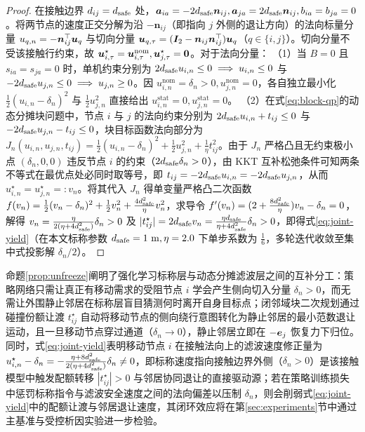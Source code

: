 \begin{proof}
在接触边界 $d_{ij}=d_{\mathrm{safe}}$ 处，$\boldsymbol a_{ia}=-2d_{\mathrm{safe}}\boldsymbol n_{ij},\boldsymbol a_{ja}=2d_{\mathrm{safe}}\boldsymbol n_{ij},b_{ia}=b_{ja}=0$。将两节点的速度正交分解为沿 $-\boldsymbol n_{ij}$（即指向 $j$ 外侧的退让方向）的法向标量分量 $u_{q,n}=-\boldsymbol n_{ij}^{\top}\boldsymbol{u}_q$ 与切向分量 $\boldsymbol{u}_{q,\tau}=(\boldsymbol{I}_2-\boldsymbol n_{ij}\boldsymbol n_{ij}^{\top})\boldsymbol{u}_q$（$q\in\{i,j\}$）。切向分量不受该接触行约束，故 $\boldsymbol{u}_{i,\tau}^\star=\boldsymbol{u}_{i,\tau}^{\mathrm{nom}},\boldsymbol{u}_{j,\tau}^\star=\boldsymbol 0$。对于法向分量：
（1）当 $B=0$ 且 $s_{ia}=s_{ja}=0$ 时，单机约束分别为 $2d_{\mathrm{safe}} u_{i,n}\le 0\implies u_{i,n}\le 0$ 与 $-2d_{\mathrm{safe}} u_{j,n}\le 0\implies u_{j,n}\ge 0$。因 $u_{i,n}^{\mathrm{nom}}=\delta_n>0,u_{j,n}^{\mathrm{nom}}=0$，各自独立最小化 $\frac12(u_{i,n}-\delta_n)^2$ 与 $\frac12 u_{j,n}^2$ 直接给出 $u_{i,n}^{\mathrm{stat}}=0,u_{j,n}^{\mathrm{stat}}=0$。
（2）在式\eqref{eq:block-qp}的动态分摊块问题中，节点 $i$ 与 $j$ 的法向约束分别为 $2d_{\mathrm{safe}} u_{i,n}+t_{ij}\le 0$ 与 $-2d_{\mathrm{safe}} u_{j,n}-t_{ij}\le 0$，块目标函数法向部分为 $J_n(u_{i,n},u_{j,n},t_{ij})=\frac12(u_{i,n}-\delta_n)^2+\frac12 u_{j,n}^2+\frac{1}{\eta}t_{ij}^2$。由于 $J_n$ 严格凸且无约束极小点 $(\delta_n,0,0)$ 违反节点 $i$ 的约束（$2d_{\mathrm{safe}}\delta_n>0$），由 KKT 互补松弛条件可知两条不等式在最优点处必同时取等号，即 $t_{ij}=-2d_{\mathrm{safe}} u_{i,n}=-2d_{\mathrm{safe}} u_{j,n}$，从而 $u_{i,n}^\star=u_{j,n}^\star=:v_n$。将其代入 $J_n$ 得单变量严格凸二次函数 $f(v_n)=\frac12(v_n-\delta_n)^2+\frac12 v_n^2+\frac{4d_{\mathrm{safe}}^2}{\eta}v_n^2$，求导令 $f'(v_n)=(2+\frac{8d_{\mathrm{safe}}^2}{\eta})v_n-\delta_n=0$，解得 $v_n=\frac{\eta}{2(\eta+4d_{\mathrm{safe}}^2)}\delta_n>0$ 及 $|t_{ij}^\star|=2d_{\mathrm{safe}} v_n=\frac{\eta d_{\mathrm{safe}}}{\eta+4d_{\mathrm{safe}}^2}\delta_n>0$，即得式\eqref{eq:joint-yield}（在本文标称参数 $d_{\mathrm{safe}}=1\ \mathrm m,\eta=2.0$ 下单步系数为 $\frac16$，多轮迭代收敛至集中式投影解 $\delta_n/2$）。
\end{proof}

命题\ref{prop:unfreeze}阐明了强化学习标称层与动态分摊滤波层之间的互补分工：策略网络只需让真正有移动需求的受阻节点 $i$ 学会产生侧向切入分量 $\delta_n>0$，而无需让外围静止邻居在标称层盲目猜测何时离开自身目标点；闭邻域块二次规划通过碰撞份额让渡 $t_{ij}^\star$ 自动将移动节点的侧向绕行意图转化为静止邻居的最小范数退让运动，且一旦移动节点穿过通道（$\delta_n\to 0$），静止邻居立即在 $-\boldsymbol{e}_j$ 恢复力下归位。同时，式\eqref{eq:joint-yield}表明移动节点 $i$ 在接触法向上的滤波速度修正量为 $u_{i,n}^\star-\delta_n=-\frac{\eta+8d_{\mathrm{safe}}^2}{2(\eta+4d_{\mathrm{safe}}^2)}\delta_n\ne 0$，即标称速度指向接触边界外侧（$\delta_n>0$）是该接触模型中触发配额转移 $|t_{ij}^\star|>0$ 与邻居协同退让的直接驱动源；若在策略训练损失中惩罚标称指令与滤波安全速度之间的法向偏差以压制 $\delta_n$，则会削弱式\eqref{eq:joint-yield}中的配额让渡与邻居退让速度，其闭环效应将在第\ref{sec:experiments}节中通过主基准与受控析因实验进一步检验。

